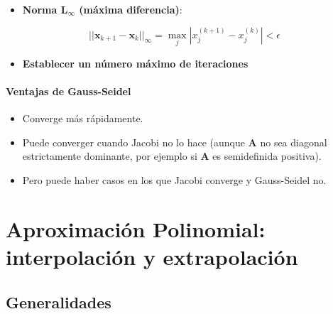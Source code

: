 \documentclass[openany]{book}
\providecommand{\tightlist}{%
  \setlength{\itemsep}{0pt}\setlength{\parskip}{0pt}}
\begin{document}
\begin{itemize}
\tightlist
\item
  \textbf{Norma L\(_\infty\) (máxima diferencia)}:
\end{itemize}

\[
||\mathbf{x}_{k+1}-\mathbf{x}_{k}||_\infty = \max_{j} |x_j^{(k+1)} - x_j^{(k)}| < \epsilon
\]

\begin{itemize}
\tightlist
\item
  \textbf{Establecer un número máximo de iteraciones}
\end{itemize}

\hypertarget{ventajas-de-gauss-seidel}{%
\subsubsection*{Ventajas de Gauss-Seidel}\label{ventajas-de-gauss-seidel}}

\begin{itemize}
\tightlist
\item
  Converge más rápidamente.
\item
  Puede converger cuando Jacobi no lo hace (aunque \(\mathbf{A}\) no sea diagonal estrictamente dominante, por ejemplo si \(\mathbf{A}\) es semidefinida positiva).
\item
  Pero puede haber casos en los que Jacobi converge y Gauss-Seidel no.
\end{itemize}

\hypertarget{aproximaciuxf3n-polinomial-interpolaciuxf3n-y-extrapolaciuxf3n}{%
\chapter{Aproximación Polinomial: interpolación y extrapolación}\label{aproximaciuxf3n-polinomial-interpolaciuxf3n-y-extrapolaciuxf3n}}

\hypertarget{generalidades-2}{%
\section{Generalidades}\label{generalidades-2}}
\end{document}
